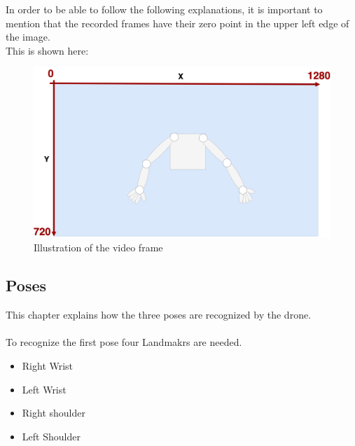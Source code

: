 \documentclass[a4paper,11pt,singlespacing]{article}
\begin{document}
In order to be able to follow the following explanations, it is important to mention that the recorded frames have their 
zero point in the upper left edge of the image.\\
This is shown here:

\begin{figure}[H]
	\centering
	\includegraphics[width=\textwidth]{images/video_frame.png}
	\caption{Illustration of the video frame}
	\label{video_frame}
\end{figure}

\subsection{Poses}

This chapter explains how the three poses are recognized by the drone.\\\\

To recognize the first pose four Landmakrs are needed.
\begin{itemize}
	\item Right Wrist
	\item Left Wrist
	\item Right shoulder
	\item Left Shoulder
\end{itemize}
\end{document}
